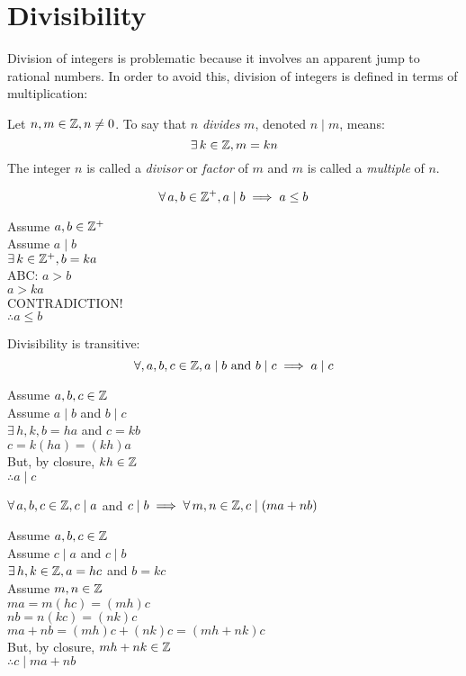 \documentclass[letterpaper,12pt,fleqn]{article}
\begin{document}
\section*{Divisibility}

Division of integers is problematic because it involves an apparent jump to
rational numbers. In order to avoid this, division of integers is defined in
terms of multiplication:

\begin{definition}
  Let $n,m\in\mathbb{Z},n\ne0$. To say that $n$ \emph{divides} $m$, denoted $n\mid m$,
  means:
  \[\exists\,k\in\mathbb{Z},m=kn\]
  The integer $n$ is called a \emph{divisor} or \emph{factor} of $m$ and $m$ is
  called a \emph{multiple} of $n$.
\end{definition}

\begin{theorem}
  \listbreak
  \[\forall\,a,b\in\mathbb{Z}^+,a\mid b\implies a\le b\]
\end{theorem}

\begin{theproof}
  Assume $a,b\in\mathbb{Z}^+$ \\
  Assume $a\mid b$ \\
  $\exists\,k\in\mathbb{Z}^+,b=ka$ \\
  ABC: $a>b$ \\
  $a>ka$ \\
  CONTRADICTION! \\
  $\therefore a\le b$
\end{theproof}

\begin{theorem}
  Divisibility is transitive:
  \[\forall,a,b,c\in\mathbb{Z},a\mid b\ \mbox{and}\ b\mid c\implies a\mid c\]
\end{theorem}

\begin{theproof}
  Assume $a,b,c\in\mathbb{Z}$ \\
  Assume $a\mid b$ and $b\mid c$ \\
  $\exists\,h,k,b=ha$ and $c=kb$ \\
  $c=k(ha)=(kh)a$ \\
  But, by closure, $kh\in\mathbb{Z}$ \\
  $\therefore a\mid c$
\end{theproof}
\newpage
\begin{theorem}
$\forall\,a,b,c\in\mathbb{Z},c\mid a$ and $c\mid b\implies\forall\,m,n\in\mathbb{Z},
    c\mid(ma+nb)$
\end{theorem}

\begin{theproof}
  Assume $a,b,c\in\mathbb{Z}$ \\
  Assume $c\mid a$ and $c\mid b$ \\
  $\exists\,h,k\in\mathbb{Z},a=hc$ and $b=kc$ \\
  Assume $m,n\in\mathbb{Z}$ \\
  $ma=m(hc)=(mh)c$ \\
  $nb=n(kc)=(nk)c$ \\
  $ma+nb=(mh)c+(nk)c=(mh+nk)c$ \\
  But, by closure, $mh+nk\in\mathbb{Z}$ \\
  $\therefore c\mid ma+nb$
\end{theproof}
\end{document}
